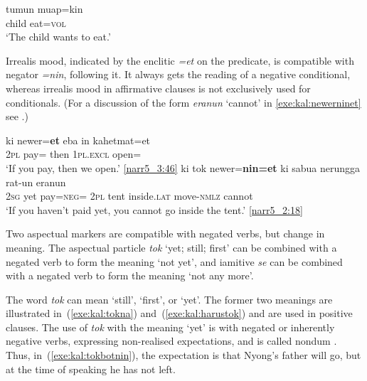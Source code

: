 \documentclass[output=paper,colorlinks,citecolor=brown,draft]{langscibook}
\begin{document}
\ea 	\label{exe:kal:kinneg}
\ea \gll tumun muap=kin\\
child eat=\textsc{vol}\\
\glt `The child wants to eat.'

\z \z 

Irrealis mood, indicated by the enclitic \textit{=et} on the predicate, is compatible with negator \textit{=nin}, following it. It always gets the reading of a negative conditional, whereas irrealis mood in affirmative clauses is not exclusively used for conditionals. (For a discussion of the form \textit{eranun} `cannot' in \ref{exe:kal:newerninet} see .)

\ea 	\label{exe:kal:neweret}
\ea \label{exe:kal:newerpos}
	\gll ki newer=\textbf{et} eba in kahetmat=et\\
	\textsc{2pl} pay={\glet} then \textsc{1pl.excl} open={\glet}\\
	\glt `If you pay, then we open.' {\href{http://hdl.handle.net/10050/00-0000-0000-0004-1B85-F}{[narr5\_3:46]}}
\ex \label{exe:kal:newerninet}
	\gll  ki tok newer=\textbf{nin=et} ki sabua nerungga rat-un eranun\\
	\textsc{2sg} yet pay=\textsc{neg}={\glet} \textsc{2pl} tent inside.\textsc{lat} move-\textsc{nmlz} cannot\\
	\glt `If you haven't paid yet, you cannot go inside the tent.' {\href{http://hdl.handle.net/10050/00-0000-0000-0004-1B85-F}{[narr5\_2:18]}}
\z \z 

Two aspectual markers are compatible with negated verbs, but change in meaning. The aspectual particle \textit{tok} `yet; still; first' can be combined with a negated verb to form the meaning `not yet', and iamitive \textit{se} can be combined with a negated verb to form the meaning `not any more'.

The word \textit{tok} can mean `still', `first', or `yet'. The former two meanings are illustrated in~(\ref{exe:kal:tokna}) and~(\ref{exe:kal:harustok}) and are used in positive clauses. The use of \textit{tok} with the meaning `yet' is with negated or inherently negative verbs, expressing non-realised expectations, and is called nondum \citep{VeselinovaDevos2021}. Thus, in~(\ref{exe:kal:tokbotnin}), the expectation is that Nyong's father will go, but at the time of speaking he has not left.
 
\end{document}
